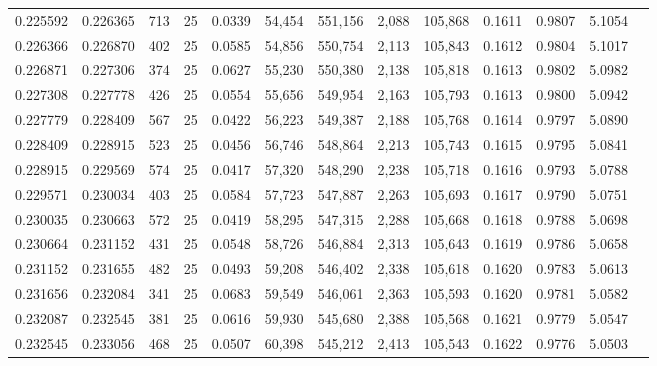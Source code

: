 \begin{tabular}{rrrrrrrrrrrrr}
0.225592 & 0.226365 &   713 &  25 &                                     0.0339 &  54,454 & 551,156 &   2,088 & 105,868 & 0.1611 & 0.9807 & 5.1054 \\
0.226366 & 0.226870 &   402 &  25 &                                     0.0585 &  54,856 & 550,754 &   2,113 & 105,843 & 0.1612 & 0.9804 & 5.1017 \\
0.226871 & 0.227306 &   374 &  25 &                                     0.0627 &  55,230 & 550,380 &   2,138 & 105,818 & 0.1613 & 0.9802 & 5.0982 \\
0.227308 & 0.227778 &   426 &  25 &                                     0.0554 &  55,656 & 549,954 &   2,163 & 105,793 & 0.1613 & 0.9800 & 5.0942 \\
0.227779 & 0.228409 &   567 &  25 &                                     0.0422 &  56,223 & 549,387 &   2,188 & 105,768 & 0.1614 & 0.9797 & 5.0890 \\
0.228409 & 0.228915 &   523 &  25 &                                     0.0456 &  56,746 & 548,864 &   2,213 & 105,743 & 0.1615 & 0.9795 & 5.0841 \\
0.228915 & 0.229569 &   574 &  25 &                                     0.0417 &  57,320 & 548,290 &   2,238 & 105,718 & 0.1616 & 0.9793 & 5.0788 \\
0.229571 & 0.230034 &   403 &  25 &                                     0.0584 &  57,723 & 547,887 &   2,263 & 105,693 & 0.1617 & 0.9790 & 5.0751 \\
0.230035 & 0.230663 &   572 &  25 &                                     0.0419 &  58,295 & 547,315 &   2,288 & 105,668 & 0.1618 & 0.9788 & 5.0698 \\
0.230664 & 0.231152 &   431 &  25 &                                     0.0548 &  58,726 & 546,884 &   2,313 & 105,643 & 0.1619 & 0.9786 & 5.0658 \\
0.231152 & 0.231655 &   482 &  25 &                                     0.0493 &  59,208 & 546,402 &   2,338 & 105,618 & 0.1620 & 0.9783 & 5.0613 \\
0.231656 & 0.232084 &   341 &  25 &                                     0.0683 &  59,549 & 546,061 &   2,363 & 105,593 & 0.1620 & 0.9781 & 5.0582 \\
0.232087 & 0.232545 &   381 &  25 &                                     0.0616 &  59,930 & 545,680 &   2,388 & 105,568 & 0.1621 & 0.9779 & 5.0547 \\
0.232545 & 0.233056 &   468 &  25 &                                     0.0507 &  60,398 & 545,212 &   2,413 & 105,543 & 0.1622 & 0.9776 & 5.0503 \\

\end{tabular}
